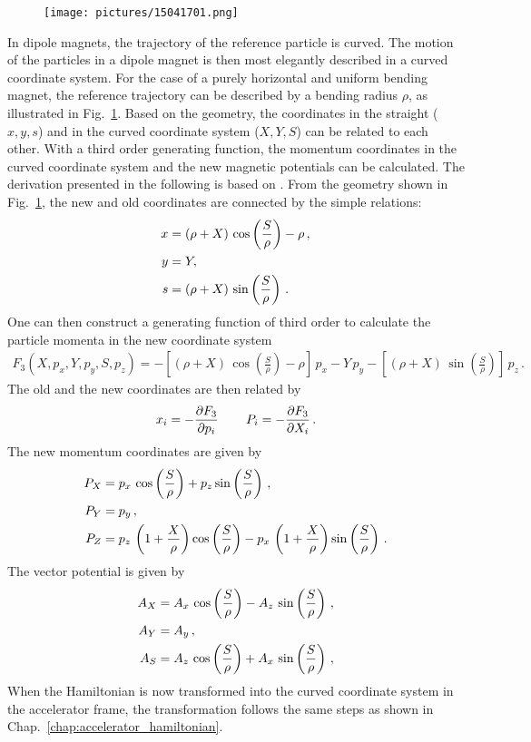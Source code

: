 %
  \begin{figure}[b]
  \centering
  \texttt{[image: pictures/15041701.png]}
  \caption{}  
  \label{pic:15041701}
  \end{figure}
%
In dipole magnets, the trajectory of the reference particle is curved. The motion of the particles in a dipole magnet is then most elegantly described in a curved coordinate system. For the case of a purely horizontal and uniform bending magnet, the reference trajectory can be described by a bending radius $\rho$, as illustrated in Fig.~\ref{pic:15041701}. Based on the geometry, the coordinates in the straight ($x,y,s$) and in the curved coordinate system ($X,Y,S$) can be related to each other. With a third order generating function, the momentum coordinates in the curved coordinate system and the new magnetic potentials can be calculated. The derivation presented in the following is based on \cite{wolski2014beam}. From the geometry shown in Fig.~\ref{pic:15041701}, the new and old coordinates are connected by the simple relations:
\begin{align}
x &= (\rho + X) \, \cos \left( \frac{S}{\rho} \right) - \rho \, , \notag \\
y &= Y , \\
s &= (\rho + X) \, \sin \left( \frac{S}{\rho} \right)  \notag \, .
\end{align}
One can then construct a generating function of third order to calculate the particle momenta in the new coordinate system~\cite{}
\begin{align}
F_3 (X,p_x,Y,p_y,S,p_z) = - \left[ (\rho + X) \, \cos \left( \frac{S}{\rho} \right) - \rho \right] \, p_x - Y \, p_y  - \left[ (\rho + X) \, \sin \left( \frac{S}{\rho} \right) \right] \, p_z \, .
\end{align}
%
The old and the new coordinates are then related by 
\begin{align}
x_i = - \frac{\partial F_3}{\partial p_i} \, \quad \quad P_i = - \frac{\partial F_3}{\partial X_i} \, .
\end{align}
The new momentum coordinates are given by
\begin{align}
P_X &= p_x \,  \cos \left( \frac{S}{\rho} \right) + p_z  \sin \left( \frac{S}{\rho} \right) \, , \notag \\
P_Y &= p_y \, , \\
P_Z &= p_z \, \left( 1 + \frac{X}{\rho} \right)  \cos \left( \frac{S}{\rho} \right) - p_x \, \left( 1 + \frac{X}{\rho} \right)  \sin \left( \frac{S}{\rho} \right) \, . \notag
\end{align}
%
The vector potential is given by
\begin{align}
A_X &= A_x \, \cos \left( \frac{S}{\rho} \right) - A_z \, \sin \left( \frac{S}{\rho} \right) \, , \notag \\
A_Y &= A_y \, , \\ 
A_S &= A_z \, \cos \left( \frac{S}{\rho} \right) + A_x \, \sin \left( \frac{S}{\rho} \right) \, , \notag 
\end{align}
When the Hamiltonian is now transformed into the curved coordinate system in the accelerator frame, the transformation follows the same steps as shown in Chap.~\ref{chap:accelerator_hamiltonian}. 



